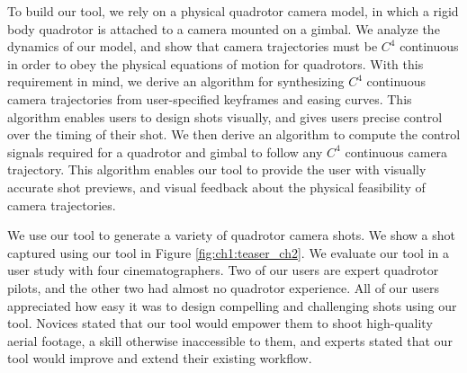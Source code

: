 To build our tool, we rely on a physical quadrotor camera model, in which a rigid body quadrotor is attached to a camera mounted on a gimbal.
We analyze the dynamics of our model, and show that camera trajectories must be $C^4$ continuous in order to obey the physical equations of motion for quadrotors.
With this requirement in mind, we derive an algorithm for synthesizing $C^4$ continuous camera trajectories from user-specified keyframes and easing curves.
This algorithm enables users to design shots visually, and gives users precise control over the timing of their shot.
We then derive an algorithm to compute the control signals required for a quadrotor and gimbal to follow any $C^4$ continuous camera trajectory.
This algorithm enables our tool to provide the user with visually accurate shot previews, and visual feedback about the physical feasibility of camera trajectories.


We use our tool to generate a variety of quadrotor camera shots. We show a shot captured using our tool in Figure \ref{fig:ch1:teaser_ch2}.
We evaluate our tool in a user study with four cinematographers.
Two of our users are expert quadrotor pilots, and the other two had almost no quadrotor experience. All of our users appreciated how easy it was to design compelling and challenging shots using our tool.
Novices stated that our tool would empower them to shoot high-quality aerial footage, a skill otherwise inaccessible to them, and experts stated that our tool would improve and extend their existing workflow.

